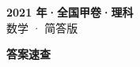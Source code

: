 \documentclass[zihao=-4, a4paper]{ctexart}
\begin{document}
\begin{center}
  {\Large\bfseries 2021 年·全国甲卷·理科}\\[4pt]
  {\large 数学 · 简答版}
\end{center}
\medskip
{}

\clearpage
{}
\begin{center}{\Large\bfseries 答案速查}\end{center}
\medskip

\end{document}
